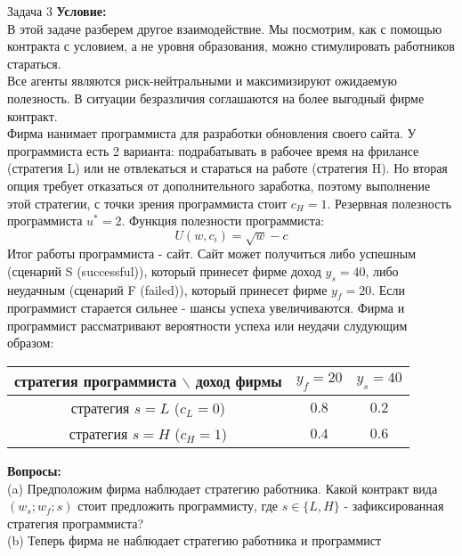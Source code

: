 \newpage
\begin{mybox}{Задача 3}
    \indent\setlength{\parindent}{1em}\textbf{Условие:}\\
    \indent\setlength{\parindent}{1em}В этой задаче разберем другое взаимодействие. Мы посмотрим, как с помощью контракта с условием, а не уровня
    образования, можно стимулировать работников стараться.\\
    \indent\setlength{\parindent}{1em}Все агенты являются риск-нейтральными и максимизируют ожидаемую полезность. В ситуации безразличия соглашаются на
    более выгодный фирме контракт.\\
    \indent\setlength{\parindent}{1em}Фирма нанимает программиста для разработки обновления своего сайта. У
    программиста есть 2 варианта: подрабатывать в
    рабочее время на фрилансе (стратегия L) или не отвлекаться и стараться на работе (стратегия H). Но вторая опция
    требует отказаться от дополнительного заработка, поэтому выполнение этой стратегии, с точки зрения программиста
    стоит $c_H=1$. Резервная полезность программиста $u^*=2$. Функция полезности программиста: $$U(w,c_i)=\sqrt{w}-c$$
    \indent\setlength{\parindent}{1em}Итог работы программиста - сайт. Сайт может получиться либо успешным (сценарий S (successful)), который принесет
    фирме доход $y_s=40$, либо неудачным (сценарий F (failed)), который принесет фирме $y_f=20$. Если программист
    старается сильнее - шансы успеха увеличиваются. Фирма и программист рассматривают вероятности успеха или неудачи слудующим образом:
    \\\begin{center}
    \begin{tabular}{ c|c|c }
     стратегия программиста $\backslash$ доход фирмы & $y_f=20$ & $y_s=40$ \\
     \hline
     стратегия $s=L$ ($c_L=0$) & $0.8$ & $0.2$ \\
     \hline
     стратегия $s=H$ ($c_H=1$) & $0.4$ & $0.6$ \\
    \end{tabular}
    \end{center}
    \indent\setlength{\parindent}{1em}\textbf{Вопросы:}\\
    \indent\setlength{\parindent}{1em}(a) Предположим фирма наблюдает стратегию работника. Какой
    контракт вида $(w_s;w_f;s)$ стоит предложить программисту, где $s\in\{L,H\}$ - зафиксированная стратегия
    программиста?\\
    \indent\setlength{\parindent}{1em}(b) Теперь фирма не наблюдает стратегию работника и программист

\end{mybox}
